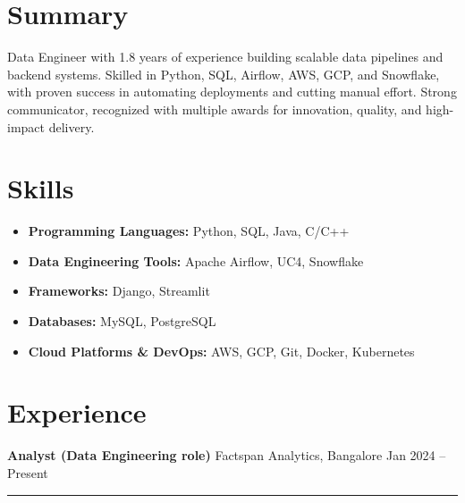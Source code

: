 


\section*{Summary}
Data Engineer with 1.8 years of experience building scalable data pipelines and backend systems. Skilled in Python, SQL, Airflow, AWS, GCP, and Snowflake, with proven success in automating deployments and cutting manual effort. Strong communicator, recognized with multiple awards for innovation, quality, and high-impact delivery.
\section*{Skills}
\begin{itemize}[leftmargin=0.5cm, label={}]
    \item \textbf{Programming Languages:} Python, SQL, Java, C/C++
    \item \textbf{Data Engineering Tools:} Apache Airflow, UC4, Snowflake
    \item \textbf{Frameworks:} Django, Streamlit
    \item \textbf{Databases:} MySQL, PostgreSQL
    \item \textbf{Cloud Platforms \& DevOps:} AWS, GCP, Git, Docker, Kubernetes
\end{itemize}


\section*{Experience}

\textbf{Analyst (Data Engineering role)} \hfill Factspan Analytics, Bangalore \hfill Jan 2024 – Present
\vspace{0.2cm}
\hrule
\vspace{0.2cm}

